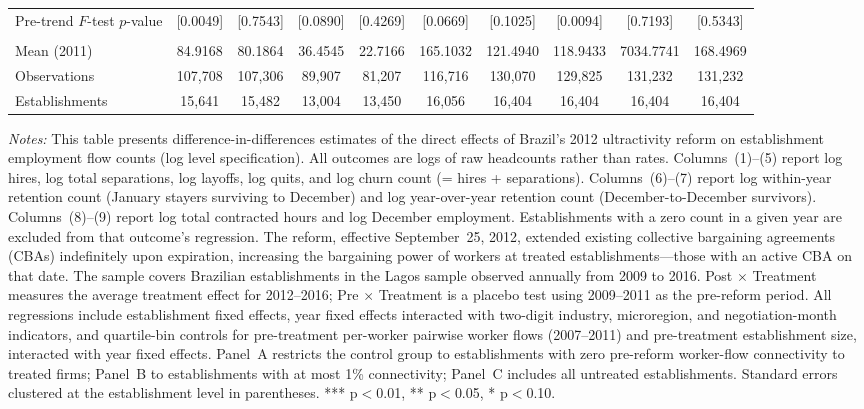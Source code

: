 \documentclass[12pt,letterpaper]{article}
\begin{document}
\begin{table}[]
\begin{threeparttable}
\begin{tabular}{lccccccccc}
Pre-trend $F$-test $p$-value & [0.0049] & [0.7543] & [0.0890] & [0.4269] & [0.0669] & [0.1025] & [0.0094] & [0.7193] & [0.5343] \\
  &  &  &  &  &  &  &  &  & \\
Mean (2011) & 84.9168 & 80.1864 & 36.4545 & 22.7166 & 165.1032 & 121.4940 & 118.9433 & 7034.7741 & 168.4969 \\
Observations & 107{,}708 & 107{,}306 & 89{,}907 & 81{,}207 & 116{,}716 & 130{,}070 & 129{,}825 & 131{,}232 & 131{,}232 \\
Establishments & 15{,}641 & 15{,}482 & 13{,}004 & 13{,}450 & 16{,}056 & 16{,}404 & 16{,}404 & 16{,}404 & 16{,}404 \\
\bottomrule
\end{tabular}
\scriptsize
\begin{tablenotes}
\item \textit{Notes:} This table presents difference-in-differences estimates of the direct effects of Brazil's 2012 ultractivity reform on establishment employment flow counts (log level specification). All outcomes are logs of raw headcounts rather than rates. Columns~(1)--(5) report log hires, log total separations, log layoffs, log quits, and log churn count (= hires + separations). Columns~(6)--(7) report log within-year retention count (January stayers surviving to December) and log year-over-year retention count (December-to-December survivors). Columns~(8)--(9) report log total contracted hours and log December employment. Establishments with a zero count in a given year are excluded from that outcome's regression. The reform, effective September~25, 2012, extended existing collective bargaining agreements (CBAs) indefinitely upon expiration, increasing the bargaining power of workers at treated establishments---those with an active CBA on that date. The sample covers Brazilian establishments in the Lagos sample observed annually from 2009 to 2016. Post $\times$ Treatment measures the average treatment effect for 2012--2016; Pre $\times$ Treatment is a placebo test using 2009--2011 as the pre-reform period. All regressions include establishment fixed effects, year fixed effects interacted with two-digit industry, microregion, and negotiation-month indicators, and quartile-bin controls for pre-treatment per-worker pairwise worker flows (2007--2011) and pre-treatment establishment size, interacted with year fixed effects. Panel~A restricts the control group to establishments with zero pre-reform worker-flow connectivity to treated firms; Panel~B to establishments with at most 1\% connectivity; Panel~C includes all untreated establishments. Standard errors clustered at the establishment level in parentheses. *** p$<$0.01, ** p$<$0.05, * p$<$0.10.
\end{tablenotes}
\end{threeparttable}
\end{table}
\end{document}
